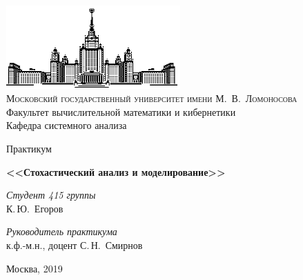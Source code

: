 \thispagestyle{empty}
\begin{center}
    \ \vspace{-3cm}

    \includegraphics[width=0.5\textwidth]{title_page/msu.eps}\\

    {\scshape Московский государственный университет имени М.~В.~Ломоносова}\\
    Факультет вычислительной математики и кибернетики\\
    Кафедра системного анализа

    \vfill

    {\LARGE Практикум}

    \vspace{1cm}

    {\Huge\bfseries <<Стохастический анализ и моделирование>>}
\end{center}

\vspace{3cm}

\begin{flushright}
    \large
    \textit{Студент 415 группы}\\
    К.\,Ю.~Егоров

    \vspace{5mm}

    \textit{Руководитель практикума}\\
    к.ф.-м.н., доцент С.\,Н.~Смирнов
\end{flushright}

\vfill

\begin{center}
    Москва, 2019
\end{center}

\clearpage